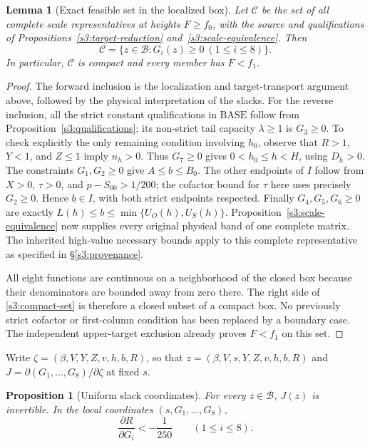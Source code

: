 \documentclass[11pt,reqno]{amsart}
\newtheorem{lemma}[theorem]{Lemma}
\newtheorem{proposition}[theorem]{Proposition}
\theoremstyle{definition}
\theoremstyle{remark}
\begin{document}
\begin{lemma}[Exact feasible set in the localized box]
\label{s3:compact-model}
Let \(\mathcal C\) be the set of all complete scale representatives
at heights \(F\ge f_0\), with the source and qualifications of
Propositions~\ref{s3:target-reduction} and~\ref{s3:scale-equivalence}.
Then
\begin{equation}\label{s3:compact-set}
 \mathcal C=\{z\in\mathcal B:G_i(z)\ge0\ (1\le i\le8)\}.
\end{equation}
In particular, \(\mathcal C\) is compact and every member has
\(F<f_1\).
\end{lemma}

\begin{proof}
The forward inclusion is the localization and target-transport
argument above, followed by the physical interpretation of the slacks.
For the reverse inclusion, all the strict constant qualifications
in \(\mathrm{BASE}\) follow from
Proposition~\ref{s3:qualifications}; its non-strict tail capacity
\(\lambda\ge1\) is \(G_3\ge0\). To check explicitly the only
remaining condition involving \(h_0\), observe that \(R>1\),
\(Y<1\), and \(Z\le1\) imply \(n_h>0\). Thus
\(G_7\ge0\) gives \(0<h_0\le h<H\), using \(D_h>0\).
The constraints \(G_1,G_2\ge0\) give \(A\le b\le B_0\).
The other endpoints of \(I\) follow from \(X>0\),
\(\tau>0\), and \(p-S_{00}>1/200\); the cofactor bound for
\(\tau\) here uses precisely \(G_2\ge0\). Hence \(b\in I\),
with both strict endpoints respected. Finally \(G_4,G_5,G_6\ge0\)
are exactly \(L(h)\le b\le\min\{U_O(h),U_S(h)\}\).
Proposition~\ref{s3:scale-equivalence} now supplies every original
physical band of one complete matrix. The inherited high-value
necessary bounds apply to this complete representative as specified
in \S\ref{s3:provenance}.

All eight functions are continuous on a neighborhood of the closed
box because their denominators are bounded away from zero there.
The right side of \eqref{s3:compact-set} is therefore a closed
subset of a compact box. No previously strict cofactor or first-column
condition has been replaced by a boundary case. The independent
upper-target exclusion already proves \(F<f_1\) on this set.
\end{proof}

Write \(\zeta=(\beta,V,Y,Z,v,h,b,R)\), so that
\(z=(\beta,V,s,Y,Z,v,h,b,R)\) and
\(J=\partial(G_1,\ldots,G_8)/\partial\zeta\) at fixed \(s\).

\begin{proposition}[Uniform slack coordinates]\label{s3:jacobian}
For every \(z\in\mathcal B\), \(J(z)\) is invertible. In the
local coordinates \((s,G_1,\ldots,G_8)\),
\begin{equation}\label{s3:height-responses}
 \frac{\partial R}{\partial G_i}<-\frac1{250}
 \qquad(1\le i\le8).
\end{equation}
\end{proposition}
\end{document}
